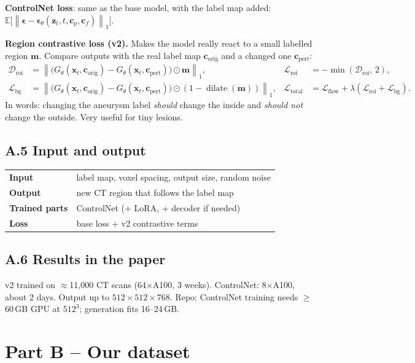 \documentclass[11pt,a4paper,oneside]{report}
\newcommand{\x}{\bm{x}}
\newcommand{\z}{\bm{z}}
\newcommand{\m}{\bm{m}}
\newcommand{\eps}{\bm{\epsilon}}
\newcommand{\E}{\mathbb{E}}
\newcommand{\Loss}{\mathcal{L}}
\newcommand{\had}{\odot}
\newcommand{\norm}[1]{\left\lVert #1 \right\rVert}
\DeclareMathOperator{\dilate}{dilate}
\begin{document}
\textbf{ControlNet loss}: same as the base model, with the label map added: $\E\big[\norm{\eps-\eps_\theta(\z_t,t,\bm c_p,\bm c_f)}_1\big]$.

\textbf{Region contrastive loss (v2).} Makes the model really react to a small labelled region $\m$. Compare outputs with the real label map $\bm c_{\text{orig}}$ and a changed one $\bm c_{\text{pert}}$:
\begin{align}
\mathcal D_{\text{roi}} &= \norm{\big(G_\theta(\x_t,\bm c_{\text{orig}})-G_\theta(\x_t,\bm c_{\text{pert}})\big)\had\m}_{1}, &
\Loss_{\text{roi}} &= -\min(\mathcal D_{\text{roi}},\,2),\\
\Loss_{\text{bg}} &= \norm{\big(G_\theta(\x_t,\bm c_{\text{orig}})-G_\theta(\x_t,\bm c_{\text{pert}})\big)\had(1-\dilate(\m))}_{1}, &
\Loss_{\text{total}} &= \Loss_{\text{flow}}+\lambda(\Loss_{\text{roi}}+\Loss_{\text{bg}}).
\end{align}
In words: changing the aneurysm label \emph{should} change the inside and \emph{should not} change the outside. Very useful for tiny lesions.

\subsection*{A.5 Input and output}
\begin{center}
\small
\begin{tabularx}{\linewidth}{lX}
\toprule
\textbf{Input} & label map, voxel spacing, output size, random noise \\
\textbf{Output} & new CT region that follows the label map \\
\textbf{Trained parts} & ControlNet (+ LoRA, + decoder if needed) \\
\textbf{Loss} & base loss + v2 contrastive terms \\
\bottomrule
\end{tabularx}
\end{center}

\subsection*{A.6 Results in the paper}
v2 trained on $\approx$11{,}000 CT scans (64$\times$A100, 3 weeks). ControlNet: 8$\times$A100, about 2 days. Output up to $512\times512\times768$. Repo: ControlNet training needs $\ge$60\,GB GPU at $512^3$; generation fits 16--24\,GB.

\section{Part B -- Our dataset}
\end{document}

